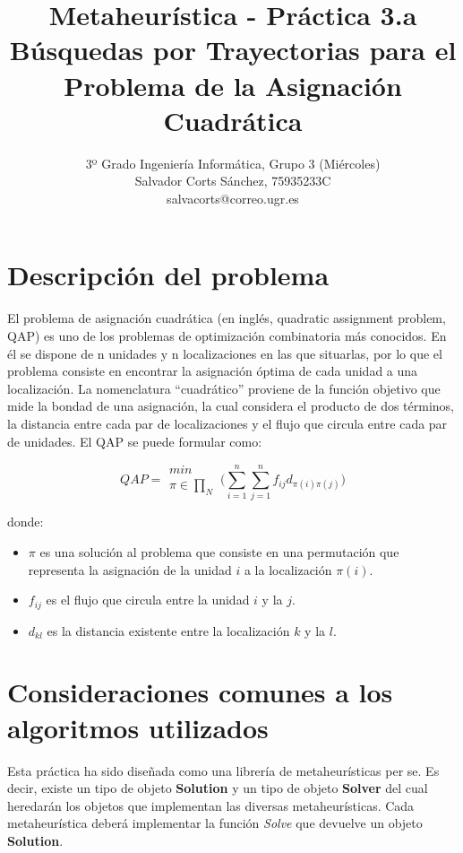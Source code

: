 \documentclass[a4paper, 12pt]{article}
\title{
\textbf{Metaheurística - Práctica 3.a} \\
Búsquedas por Trayectorias para el Problema de la Asignación Cuadrática
}
\author{
3º Grado Ingeniería Informática, Grupo 3 (Miércoles)\\
Salvador Corts Sánchez, 75935233C \\
salvacorts@correo.ugr.es
}
\date{}
\begin{document}
   \maketitle
   
   \newpage
   \tableofcontents

   
   \newpage
   \section{Descripción del problema}
   El problema de asignación cuadrática (en inglés, quadratic assignment problem, QAP) es uno de los problemas de optimización combinatoria más conocidos. En él se dispone de n unidades y n localizaciones en las que situarlas, por lo que el problema consiste en encontrar la asignación óptima de cada unidad a una localización. La nomenclatura “cuadrático” proviene de la función objetivo que mide la bondad de una asignación, la cual considera el producto de dos términos, la distancia entre cada par de localizaciones y el flujo que circula entre cada par de unidades. El QAP se puede formular como:
   
   $$QAP = 
\begin{matrix}
min\\
\pi \in \prod_N 
\end{matrix}   \Bigg( \sum_{i=1}^{n} \sum_{j=1}^{n} f_{ij}d_{\pi(i)\pi(j)} \Bigg)   
   $$
   
   donde:
   \begin{itemize}
      \item \textbf{$\pi$} es una solución al problema que consiste en una permutación que representa la asignación de la unidad $i$ a la localización  $\pi(i)$.
      
      \item $f_{ij}$ es el flujo que circula entre la unidad $i$ y la $j$.
      
      \item $d_{kl}$ es la distancia existente entre la localización $k$ y la $l$.
   \end{itemize}
   
   
   \newpage
   \section{Consideraciones comunes a los algoritmos utilizados}
   Esta práctica ha sido diseñada como una librería de metaheurísticas per se. Es decir, existe un tipo de objeto \textbf{Solution} y un tipo de objeto \textbf{Solver} del cual heredarán los objetos que implementan las diversas metaheurísticas. Cada metaheurística deberá implementar la función \textit{Solve} que devuelve un objeto \textbf{Solution}.
   
\end{document}
